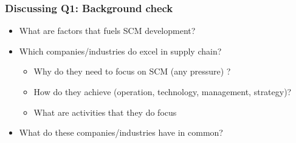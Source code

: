 \documentclass[10pt,handout]{beamer}
\begin{document}
\begin{frame}
  \frametitle{Discussing Q1: Background check \forIE}

  \begin{itemize}
    \item What are factors that fuels SCM development?
    \item Which \alert{companies/industries} do excel in supply chain?
    \begin{itemize}
      \item Why do they need to focus on SCM (any pressure) ?
      \item How do they achieve (operation, technology, management, strategy)?
      \item What are \alert{activities} that they do focus \NextHalfLine
    \end{itemize}
    \item What do these companies/industries have in common?
  \end{itemize}
  \hfill \hyperlink{why_care}{}

\end{frame}
\end{document}
